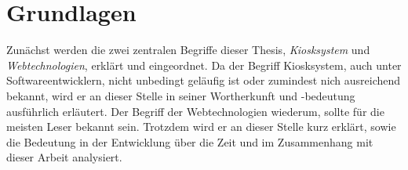 \chapter{Grundlagen}
\label{chap:grundlagen}

Zunächst werden die zwei zentralen Begriffe dieser Thesis, \emph{Kiosksystem} und
\emph{Webtechnologien}, erklärt und eingeordnet. Da der Begriff
Kiosksystem, auch unter Softwareentwicklern, nicht unbedingt geläufig ist oder
zumindest nich ausreichend bekannt, wird er an dieser Stelle in seiner Wortherkunft
und -bedeutung ausführlich erläutert. Der Begriff der Webtechnologien wiederum, sollte
für die meisten Leser bekannt sein. Trotzdem wird er an dieser Stelle kurz erklärt, sowie
die Bedeutung in der Entwicklung über die Zeit und im Zusammenhang mit dieser Arbeit
analysiert.


